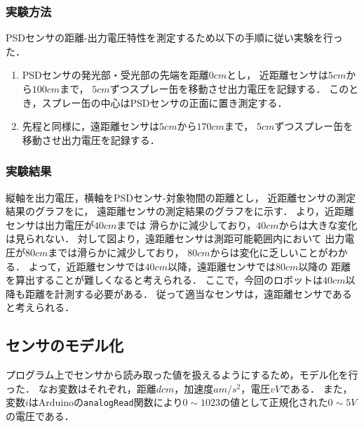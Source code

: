 \documentclass[11pt,a4]{jsarticle}
\begin{document}

    \subsubsection{実験方法}
      PSDセンサの距離-出力電圧特性を測定するため以下の手順に従い実験を行った．
      \begin{enumerate}
        \item PSDセンサの発光部・受光部の先端を距離$0\unit{cm}$とし，
              近距離センサは$5\unit{cm}$から$100\unit{cm}$まで，
              $5\unit{cm}$ずつスプレー缶を移動させ出力電圧を記録する．
              このとき，スプレー缶の中心はPSDセンサの正面に置き測定する．
        \item 先程と同様に，遠距離センサは$5\unit{cm}$から$170\unit{cm}$まで，
              $5\unit{cm}$ずつスプレー缶を移動させ出力電圧を記録する．
      \end{enumerate}

    \subsubsection{実験結果}
      縦軸を出力電圧，横軸をPSDセンサ-対象物間の距離とし，
      近距離センサの測定結果のグラフをに，
      遠距離センサの測定結果のグラフをに示す．
      より，近距離センサは出力電圧が$40\unit{cm}$までは
      滑らかに減少しており，$40\unit{cm}$からは大きな変化は見られない．
      対して図より，遠距離センサは測距可能範囲内において
      出力電圧が$80\unit{cm}$までは滑らかに減少しており，
      $80\unit{cm}$からは変化に乏しいことがわかる．
      よって，近距離センサでは$40\unit{cm}$以降，遠距離センサでは$80\unit{cm}$以降の
      距離を算出することが難しくなると考えられる．
      ここで，今回のロボットは$40\unit{cm}$以降も距離を計測する必要がある．
      従って適当なセンサは，遠距離センサであると考えられる．


  \subsection{センサのモデル化}
    プログラム上でセンサから読み取った値を扱えるようにするため，モデル化を行った．
    なお変数はそれぞれ，距離$d\unit{cm}$，加速度$a\unit{m/s^2}$，電圧$v\unit{V}$である．
    また，変数$i$はArduinoの\texttt{analogRead}関数により$0\sim1023$の値として正規化された$0\sim5\unit{V}$の電圧である．
\end{document}

